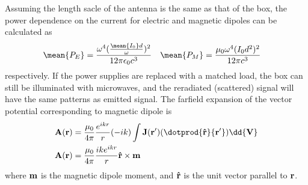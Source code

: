 \documentclass[12pt]{extarticle}
\begin{document}
\begin{outline}
\begin{itemize}
        \end{itemize}
        Assuming the length sacle of the antenna is the same as that of the box, the power dependence on the current for electric and magnetic dipoles can be calculated as \begin{align*}
            \mean{P_E} &= \frac{\omega^4 (\frac{\mean{I_0}d}{\omega} )^2}{12\pi\epsilon_0 c^3}& \mean{P_M} &= \frac{\mu_0 \omega^4 (I_0d^2)^2}{12\pi c^3}
        \end{align*}
        respectively. If the power supplies are replaced with a matched load, the box can still be illuminated with microwaves, and the reradiated (scattered) signal will have the same patterns as emitted signal.
        \1 The farfield expansion of the vector potential corresponding to magnetic dipole is 
        \begin{align*}
            \bf A (\bf r) &=  \frac{\mu_0}{4\pi} \frac{e^{ikr}}{r}( - ik) \int \bf J(\bf{r'})(\dotprod{\hat{r}}{r'}) \dd{V}\\
            \bf A (\bf r) &=  \frac{\mu_0}{4\pi} \frac{ik e^{ikr}}{r} \bf{\hat{r}} \times \bf m
        \end{align*}
        where \(\bf m\) is the magnetic dipole moment, and \(\bf{\hat{r}}\) is the unit vector parallel to \(\bf r\).


\end{outline}
\end{document}
